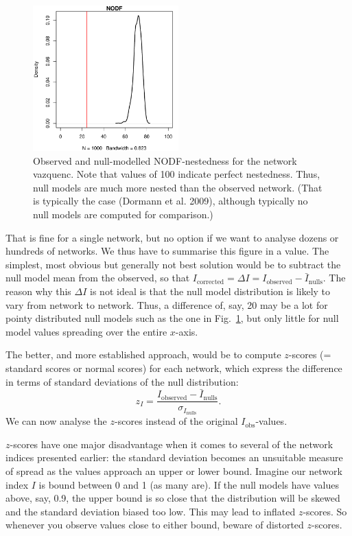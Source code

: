 \documentclass[a4paper, 11pt]{article}\usepackage[]{graphicx}\usepackage[]{color}
\newcommand{\ind}[1]{#1\index{#1}}           			   %
\begin{document}
\begin{figure}
\centering
\includegraphics[width=0.5\textwidth]{figures/NODFnull}
\caption{Observed and null-modelled NODF-nestedness for the network vazquenc. Note that values of 100 indicate perfect nestedness. Thus, null models are much more nested than the observed network. (That is typically the case (Dormann et al. 2009), although typically no null models are computed for comparison.)}
\label{fig:NODFnull}
\end{figure}
%
That is fine for a single network, but no option if we want to analyse dozens or hundreds of networks. We thus have to summarise this figure in a value. The simplest, most obvious but generally not best solution would be to subtract the null model mean from the observed, so that $I_\text{corrected} = \Delta I= I_\text{observed} - \bar{I}_\text{nulls}$. The reason why this $\Delta I$ is not ideal is that the null model distribution is likely to vary from network to network. Thus, a difference of, say, 20 may be a lot for pointy distributed null models such as the one in Fig.~\ref{fig:NODFnull}, but only little for null model values spreading over the entire $x$-axis.

The better, and more established approach, would be to compute $z$-scores (= \ind{standard score}s or \ind{normal score}s) for each network, which express the difference in terms of standard deviations of the null distribution: 
\[z_I= \frac{I_\text{observed} - \bar{I}_\text{nulls}}{\sigma_{I_\text{nulls}}}.\] We can now analyse the $z$-scores instead of the original $I_\text{obs}$-values.

$z$-scores have one major disadvantage when it comes to several of the network indices presented earlier: the standard deviation becomes an unsuitable measure of spread as the values approach an upper or lower bound. Imagine our network index $I$ is bound between 0 and 1 (as many are). If the null models have values above, say, 0.9, the upper bound is so close that the distribution will be skewed and the standard deviation biased too low. This may lead to inflated $z$-scores. So whenever you observe values close to either bound, beware of distorted $z$-scores.
\end{document}
